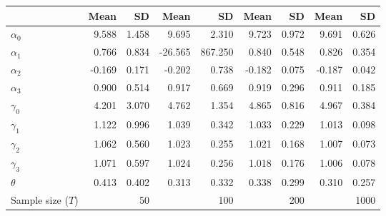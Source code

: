 
\begin{tabular}[t]{lrrrrrrrr}
\toprule
  & Mean & SD & Mean  & SD  & Mean   & SD   & Mean    & SD   \\
\midrule
$\alpha_{0}$ & 9.588 & 1.458 & 9.695 & 2.310 & 9.723 & 0.972 & 9.691 & 0.626\\
$\alpha_{1}$ & 0.766 & 0.834 & -26.565 & 867.250 & 0.840 & 0.548 & 0.826 & 0.354\\
$\alpha_{2}$ & -0.169 & 0.171 & -0.202 & 0.738 & -0.182 & 0.075 & -0.187 & 0.042\\
$\alpha_{3}$ & 0.900 & 0.514 & 0.917 & 0.669 & 0.919 & 0.296 & 0.911 & 0.185\\
$\gamma_{0}$ & 4.201 & 3.070 & 4.762 & 1.354 & 4.865 & 0.816 & 4.967 & 0.384\\
$\gamma_{1}$ & 1.122 & 0.996 & 1.039 & 0.342 & 1.033 & 0.229 & 1.013 & 0.098\\
$\gamma_{2}$ & 1.062 & 0.560 & 1.023 & 0.255 & 1.021 & 0.168 & 1.007 & 0.073\\
$\gamma_{3}$ & 1.071 & 0.597 & 1.024 & 0.256 & 1.018 & 0.176 & 1.006 & 0.078\\
$\theta$ & 0.413 & 0.402 & 0.313 & 0.332 & 0.338 & 0.299 & 0.310 & 0.257\\
Sample size ($T$) &  & 50 &  & 100 &  & 200 &  & 1000\\
\bottomrule
\end{tabular}
